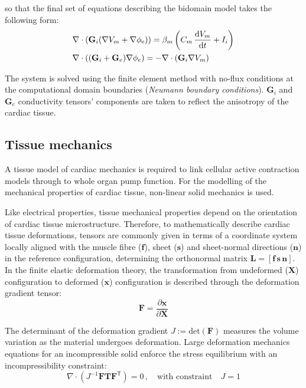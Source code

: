 \noindent
so that the final set of equations describing the bidomain model takes the following form:
%
\begin{align}\label{eq:bidomainmodel}
    & \nabla\cdot(\mathbf{G}_i(\nabla V_m + \nabla \phi_{\text{e}})) = \beta_m\left(C_m\,\dfrac{\mathrm{d}{V_m}}{\mathrm{d}{t}} + I_i\right) \\
    & \nabla\cdot((\mathbf{G}_i + \mathbf{G}_e)\nabla \phi_e) = -\nabla\cdot(\mathbf{G}_i\nabla V_m)
\end{align}

\noindent
The system is solved using the finite element method with no-flux conditions at the computational domain boundaries (\textit{Neumann boundary conditions}). $\mathbf{G}_i$ and $\mathbf{G}_e$ conductivity tensors' components are taken to reflect the anisotropy of the cardiac tissue.


%
%
%
\subsection{Tissue mechanics}\label{sec:tissue_mech_math_modelling}
A tissue model of cardiac mechanics is required to link cellular active contraction models through to whole organ pump function. For the modelling of the mechanical properties of cardiac tissue, non-linear solid mechanics is used.

\vspace{0.2cm}
Like electrical properties, tissue mechanical properties depend on the orientation of cardiac tissue microstructure. Therefore, to mathematically describe cardiac tissue deformations, tensors are commonly given in terms of a coordinate system locally aligned with the muscle fibre ($\mathbf{f}$), sheet ($\mathbf{s}$) and sheet-normal directions ($\mathbf{n}$) in the reference configuration, determining the orthonormal matrix $\mathbf{L} = [\mathbf{f}\,\mathbf{s}\,\mathbf{n}]$. In the finite elastic deformation theory, the transformation from undeformed ($\mathbf{X}$) configuration to deformed ($\mathbf{x}$) configuration is described through the deformation gradient tensor:
%
\begin{equation}
    \mathbf{F} = \frac{\partial \mathbf{x}}{\partial\mathbf{X}}
\end{equation}

\noindent
The determinant of the deformation gradient $J:=\text{det}(\mathbf{F})$ measures the volume variation as the material undergoes deformation. Large deformation mechanics equations for an incompressible solid enforce the stress equilibrium with an incompressibility constraint:
%
\begin{equation}
    \nabla\cdot(J^{-1}\mathbf{F}\mathbf{T}\mathbf{F}^\mathsf{T}) = 0\,,\quad\text{with constraint}\quad J = 1
\end{equation}

